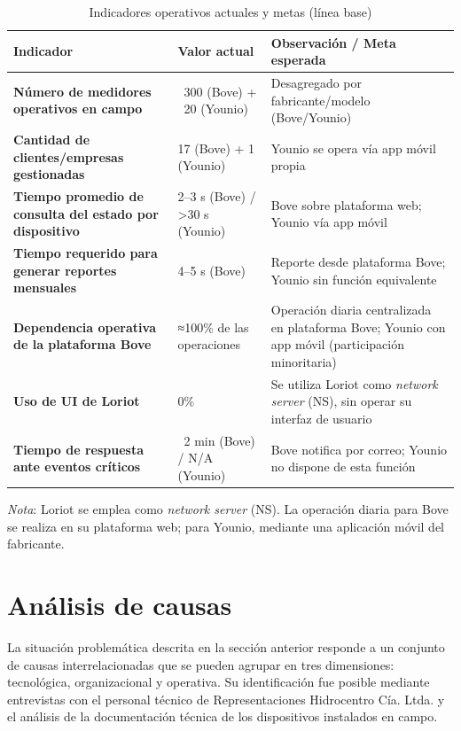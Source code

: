 \documentclass[12pt,a4paper,oneside]{report}
\begin{document}
\begin{table}[H]
\caption{Indicadores operativos actuales y metas (línea base)}
\label{tab:indicadores-problema}
\centering
\begin{tabularx}{\textwidth}{>{\bfseries}l p{3.2cm} X}
\toprule
Indicador & Valor actual & Observación / Meta esperada \\
\midrule
Número de medidores operativos en campo & ~300 (Bove) + ~20 (Younio) & Desagregado por fabricante/modelo (Bove/Younio) \\
Cantidad de clientes/empresas gestionadas & 17 (Bove) + 1 (Younio) & Younio se opera vía app móvil propia \\
Tiempo promedio de consulta del estado por dispositivo & 2–3 s (Bove) / >30 s (Younio) & Bove sobre plataforma web; Younio vía app móvil \\
Tiempo requerido para generar reportes mensuales & 4–5 s (Bove) & Reporte desde plataforma Bove; Younio sin función equivalente \\
Dependencia operativa de la plataforma Bove & ≈100\% de las operaciones & Operación diaria centralizada en plataforma Bove; Younio con app móvil (participación minoritaria) \\
Uso de UI de Loriot & 0\% & Se utiliza Loriot como \textit{network server} (NS), sin operar su interfaz de usuario \\
Tiempo de respuesta ante eventos críticos & ~2 min (Bove) / N/A (Younio) & Bove notifica por correo; Younio no dispone de esta función \\
\bottomrule
\end{tabularx}
\end{table}

\noindent\footnotesize\textit{Nota}: Loriot se emplea como \textit{network server} (NS). La operación diaria para Bove se realiza en su plataforma web; para Younio, mediante una aplicación móvil del fabricante.

\section{Análisis de causas}\label{analisis-de-causas}

La situación problemática descrita en la sección anterior responde a un conjunto de causas interrelacionadas que se pueden agrupar en tres dimensiones: tecnológica, organizacional y operativa. Su identificación fue posible mediante entrevistas con el personal técnico de Representaciones Hidrocentro Cía. Ltda. y el análisis de la documentación técnica de los dispositivos instalados en campo.
\end{document}
